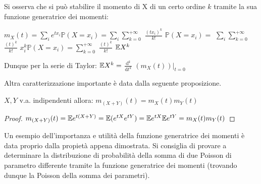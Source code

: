 \vspace{10px}

Si osserva che si può stabilire il momento di X di un certo ordine $k$ tramite la sua funzione generatrice dei momenti:
\begin{center}
    $m_X(t)=\sum\limits_ie^{tx_i}\mathbb{P}(X=x_i)=\sum\limits_i\sum\limits_{k=0}^{+\infty}$ {\large$\frac{(tx_i)^k}{k!}$} 
    $\mathbb{P}(X=x_i)=$
    \newline
    $\sum\limits_i\sum\limits_{k=0}^{+\infty}$ {\large$\frac{(t)^k}{k!}$} 
    $x_i^k\mathbb{P}(X=x_i)=\sum\limits_{k=0}^{+\infty}$ {\large$\frac{(t)^k}{k!}$} $\mathbb{E} X^k$
\end{center}

Dunque per la serie di Taylor: $\mathbb{E} X^k=$ {\Large$\frac{\mathrm d^k}{\mathrm d t^k}$}
$\left( m_X(t) \right)|_{t=0}$

\vspace{15px}

Altra caratterizzazione importante è data dalla seguente proposizione.

\begin{proposition}
$X,Y$ v.a. indipendenti allora: $m_{(X+Y)}(t)=m_X(t)m_Y(t)$
\begin{proof}
$m_{(X+Y)}(t)=\mathbb{E} e^{t(X+Y)}=\mathbb{E} (e^{tX}e^{tY})=\mathbb{E} e^{tX}\mathbb{E} e^{tY}=m_X(t)m_Y(t)$
\end{proof}
\end{proposition}

\vspace{5px}

Un esempio dell'importanza e utilità della funzione generatrice dei momenti è data proprio dalla propietà appena dimostrata. Si consiglia di provare a determinare la distribuzione di probabilità della somma di due Poisson di parametro differente tramite la funzione generatrice dei momenti (trovando dunque la Poisson della somma dei parametri).